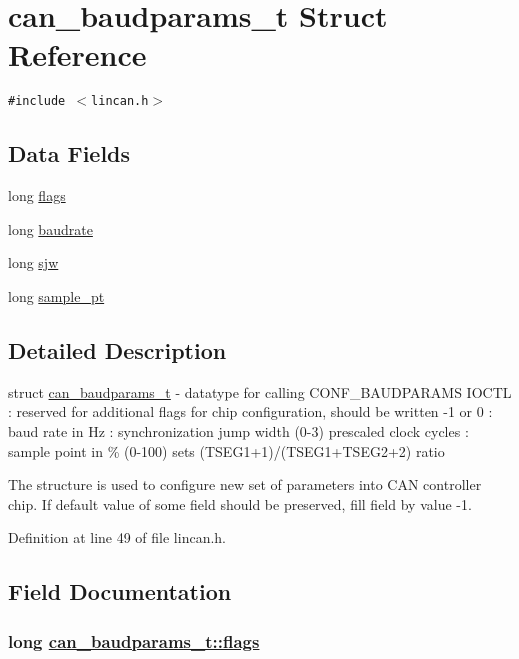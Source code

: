 \hypertarget{structcan__baudparams__t}{
\section{can\_\-baudparams\_\-t Struct Reference}
\label{structcan__baudparams__t}
}
{\tt \#include $<$lincan.h$>$}

\subsection*{Data Fields}
\begin{CompactItemize}
\item 
long \hyperlink{structcan__baudparams__t_6186d236aabd8604eb9d39f518b014fa}{flags}
\item 
long \hyperlink{structcan__baudparams__t_b9e5b5418206d02cc1ff852b6bc61d5e}{baudrate}
\item 
long \hyperlink{structcan__baudparams__t_a81e104a371b1efc2cc08031afac924c}{sjw}
\item 
long \hyperlink{structcan__baudparams__t_b5d2e0ccd2e1f474d9e9d08d3d7fa9ed}{sample\_\-pt}
\end{CompactItemize}


\subsection{Detailed Description}
struct \hyperlink{structcan__baudparams__t}{can\_\-baudparams\_\-t} - datatype for calling CONF\_\-BAUDPARAMS IOCTL : reserved for additional flags for chip configuration, should be written -1 or 0 : baud rate in Hz : synchronization jump width (0-3) prescaled clock cycles : sample point in \% (0-100) sets (TSEG1+1)/(TSEG1+TSEG2+2) ratio

The structure is used to configure new set of parameters into CAN controller chip. If default value of some field should be preserved, fill field by value -1. 



Definition at line 49 of file lincan.h.

\subsection{Field Documentation}
\hypertarget{structcan__baudparams__t_6186d236aabd8604eb9d39f518b014fa}{
\subsubsection[flags]{\setlength{\rightskip}{0pt plus 5cm}long \hyperlink{structcan__baudparams__t_6186d236aabd8604eb9d39f518b014fa}{can\_\-baudparams\_\-t::flags}}}
\label{structcan__baudparams__t_6186d236aabd8604eb9d39f518b014fa}




